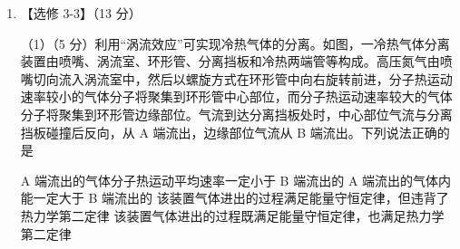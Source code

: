 \documentclass[\gkver]{gaokaozhenti}
\begin{document}
\begin{enumerate}
{$2(1 + \lambda)gh_{2} = (kv_{2})^{2}$，$2(1 - \lambda)gh_{2} = v_{3}^{2} - v'^{2}$

同理化简可得

$v'^{2} = v_{3}^{2} - \frac{h}{H}v_{2}^{2}$……③

……

第 $N$ 次反弹可得

$v'^{2} = v_{N}^{2} - \frac{h}{H}v_{N-1}^{2}$……（N）

对式子①②③……(N)两侧分别乘以 $(\frac{H}{h})^{0}$、$\frac{H}{h}$、$\frac{H^{2}}{h^{2}}$……、$\frac{H^{N-1}}{h^{N-1}}$，再相加可得

$(1 + \frac{H}{h} + \frac{H^{2}}{h^{2}} + \frac{H^{3}}{h^{3}} + \cdots + \frac{H^{N-1}}{h^{N-1}})v'^{2} = \frac{H^{N-1}}{h^{N-1}}v_{N}^{2} - \frac{h}{H}v_{0}^{2}$

得

$\frac{1 - (\frac{H}{h})^{N}}{1 - \frac{H}{h}}v'^{2} = \frac{H^{N-1}}{h^{N-1}}v_{N}^{2} - \frac{h}{H}v_{0}^{2}$

其中，$v_{0}^{2} = 2(1 - \lambda)gH$，$(kv_{N})^{2} = 2(1 + \lambda)gH$，可得

$v' = \sqrt{\frac{2g(1 - \lambda)(H - h)(H^{N+1} - h^{N+1})}{h(H^{N} - h^{N})}}$

可得冲量 $I$ 的大小

$I = mv' = m\sqrt{\frac{2g(1 - \lambda)(H - h)(H^{N+1} - h^{N+1})}{h(H^{N} - h^{N})}}$。
}

\item
【选修 3-3】（13 分）

（1）（5 分）利用“涡流效应”可实现冷热气体的分离。如图，一冷热气体分离装置由喷嘴、涡流室、环形管、分离挡板和冷热两端管等构成。高压氮气由喷嘴切向流入涡流室中，然后以螺旋方式在环形管中向右旋转前进，分子热运动速率较小的气体分子将聚集到环形管中心部位，而分子热运动速率较大的气体分子将聚集到环形管边缘部位。气流到达分离挡板处时，中心部位气流与分离挡板碰撞后反向，从 A 端流出，边缘部位气流从 B 端流出。下列说法正确的是


{A 端流出的气体分子热运动平均速率一定小于 B 端流出的}
{A 端流出的气体内能一定大于 B 端流出的}
{该装置气体进出的过程满足能量守恒定律，但违背了热力学第二定律}
{该装置气体进出的过程既满足能量守恒定律，也满足热力学第二定律}


\end{enumerate}
\end{document}

